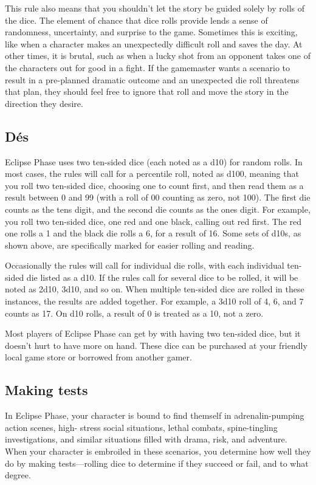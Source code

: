 This rule also means that you shouldn't let the story be guided solely by rolls of the dice. The element of chance that dice rolls provide lends a sense of randomness, uncertainty, and surprise to the game. Sometimes this is exciting, like when a character makes an unexpectedly difficult roll and saves the day. At other times, it is brutal, such as when a lucky shot from an opponent takes one of the characters out for good in a fight. If the gamemaster wants a scenario to result in a pre-planned dramatic outcome and an unexpected die roll threatens that plan, they should feel free to ignore that roll and move the story in the direction they desire. 

\subsection{Dés} \label{sec:dice-1} 

Eclipse Phase uses two ten-sided dice (each noted as a d10) for random rolls. In most cases, the rules will call for a percentile roll, noted as d100, meaning that you roll two ten-sided dice, choosing one to count first, and then read them as a result between 0 and 99 (with a roll of 00 counting as zero, not 100). The first die counts as the tens digit, and the second die counts as the ones digit. For example, you roll two ten-sided dice, one red and one black, calling out red first. The red one rolls a 1 and the black die rolls a 6, for a result of 16. Some sets of d10s, as shown above, are specifically marked for easier rolling and reading. 

Occasionally the rules will call for individual die rolls, with each individual ten-sided die listed as a d10. If the rules call for several dice to be rolled, it will be noted as 2d10, 3d10, and so on. When multiple ten-sided dice are rolled in these instances, the results are added together. For example, a 3d10 roll of 4, 6, and 7 counts as 17. On d10 rolls, a result of 0 is treated as a 10, not a zero. 

Most players of Eclipse Phase can get by with having two ten-sided dice, but it doesn't hurt to have more on hand. These dice can be purchased at your friendly local game store or borrowed from another gamer. 

\subsection{Making tests} \label{sec:making-tests} 

In Eclipse Phase, your character is bound to find themself in adrenalin-pumping action scenes, high- stress social situations, lethal combats, spine-tingling investigations, and similar situations filled with drama, risk, and adventure. When your character is embroiled in these scenarios, you determine how well they do by making tests—rolling dice to determine if they succeed or fail, and to what degree. 

